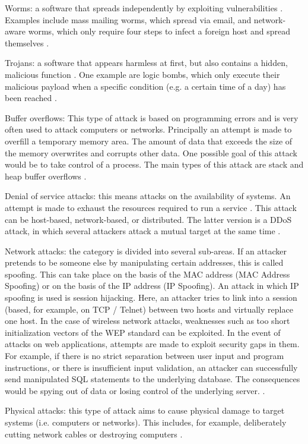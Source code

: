 \documentclass[conference]{IEEEtran}
\begin{document}
\smallskip Worms: a software that spreads independently by exploiting vulnerabilities \cite{b6}. Examples include mass mailing worms, which spread via email, and network-aware worms, which only require four steps to infect a foreign host and spread themselves \cite{b2}.

\smallskip Trojans: a software that appears harmless at first, but also contains a hidden, malicious function \cite{b6}. One example are logic bombs, which only execute their malicious payload when a specific condition (e.g. a certain time of a day) has been reached \cite{b2}.

\smallskip Buffer overflows: This type of attack is based on programming errors and is very often used to attack computers or networks. Principally an attempt is made to overfill a temporary memory area. The amount of data that exceeds the size of the memory overwrites and corrupts other data. One possible goal of this attack would be to take control of a process. The main types of this attack are stack and heap buffer overflows \cite{b2}.

\smallskip Denial of service attacks: this means attacks on the availability of systems.  An attempt is made to exhaust the resources required to run a service \cite{b6}. This attack can be host-based, network-based, or distributed. The latter version is a DDoS attack, in which several attackers attack a mutual target at the same time \cite{b2}.

\smallskip Network attacks: the category is divided into several sub-areas. If an attacker pretends to be someone else by manipulating certain addresses, this is called spoofing. This can take place on the basis of the MAC address (MAC Address Spoofing) or on the basis of the IP address (IP Spoofing). An attack in which IP spoofing is used is session hijacking. Here, an attacker tries to link into a session (based, for example, on TCP / Telnet) between two hosts and virtually replace one host. In the case of wireless network attacks, weaknesses such as too short initialization vectors of the WEP standard can be exploited. In the event of attacks on web applications, attempts are made to exploit security gaps in them.  For example, if there is no strict separation between user input and program instructions, or there is insufficient input validation, an attacker can successfully send manipulated SQL statements to the underlying database. The consequences would be spying out of data or losing control of the underlying server. \cite{b2}.

\smallskip Physical attacks: this type of attack aims to cause physical damage to target systems (i.e. computers or networks). This includes, for example, deliberately cutting network cables or destroying computers \cite{b2}.
\end{document}
